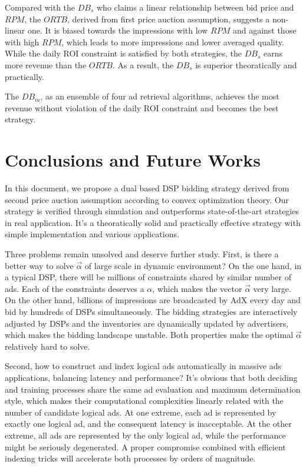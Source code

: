 \documentclass[sigconf]{acmart}
\newcommand{\valpha}{\vec{\alpha}}
\begin{document}
Compared with the $DB_s$ who claims a linear relationship between bid price and $RPM$,
    the $ORTB$, derived from first price auction assumption, suggests a non-linear one.
It is biased towards the impressions with low $RPM$ and against those with high $RPM$,
    which leads to more impressions and lower averaged quality.
While the daily ROI constraint is satisfied by both strategies,
    the $DB_s$ earns more revenue than the $ORTB$. As a result, the $DB_s$ is superior theoratically and practically.

The $DB_m$, as an ensemble of four ad retrieval algorithms,
    achieves the most revenue without violation of the daily ROI constraint and becomes the best strategy.

\section{Conclusions and Future Works}

In this document, we propose a dual based DSP bidding strategy
    derived from second price auction assumption according to convex optimization theory.
Our strategy is verified through simulation and outperforms state-of-the-art strategies in real application.
It's a theoratically solid and practically effective strategy with simple implementation and various applications.

Three problems remain unsolved and deserve further study.
First, is there a better way to solve $\valpha$ of large scale in dynamic environment?
On the one hand, in a typical DSP, there will be millions of constraints shared by similar number of ads.
Each of the constraints deserves a $\alpha$, which makes the vector $\valpha$ very large.
On the other hand, billions of impressions are broadcasted by AdX every day and bid by hundreds of DSPs simultaneously.
The bidding strategies are interactively adjusted by DSPs and the inventories are dynamically updated by advertisers,
    which makes the bidding landscape unstable.
Both properties make the optimal $\valpha$ relatively hard to solve.

Second, how to construct and index logical ads automatically in massive ads applications, balancing latency and performance?
It's obvious that both deciding and training processes share the same ad evaluation and maximum determination style,
    which makes their computational complexities linearly related with the number of candidate logical ads.
At one extreme, each ad is represented by exactly one logical ad, and the consequent latency is inacceptable.
At the other extreme, all ads are represented by the only logical ad, while the performance might be seriously degenerated.
A proper compromise combined with efficient indexing tricks will accelerate both processes by orders of magnitude.
\end{document}
